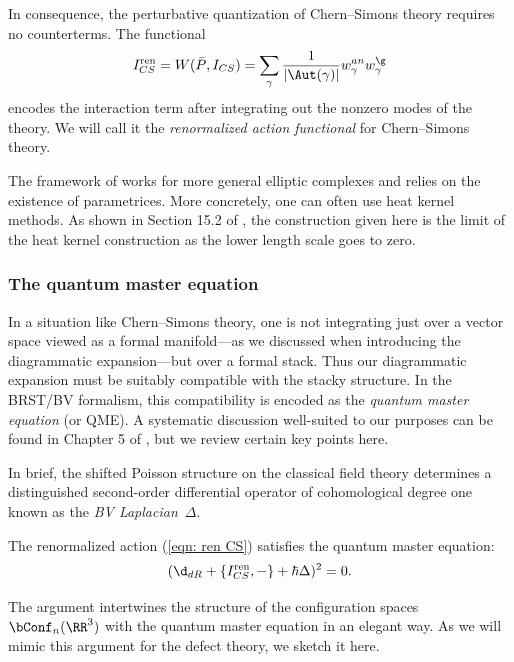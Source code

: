 \documentclass[10pt]{amsart}
\begin{document}
In consequence, the perturbative quantization of Chern--Simons theory requires no counterterms.
The functional
\begin{equation}
\label{eqn: ren CS}
I^{\rm ren}_{CS} = W(\bar{P},I_{CS}) = \sum_\gamma \frac{1}{|\Aut(\gamma)|} w_\gamma^{an} w_\gamma^\g
\end{equation}
encodes the interaction term after integrating out the nonzero modes of the theory.
We will call it the {\em renormalized action functional} for Chern--Simons theory.

\begin{rmk}
The framework of \cite{CosBook} works for more general elliptic complexes
and relies on the existence of parametrices. 
More concretely, one can often use heat kernel methods.
As shown in Section 15.2 of \cite{CosCS}, 
the construction given here is the limit of the heat kernel construction as the lower length scale goes to zero.
\end{rmk}

\subsubsection{The quantum master equation}
\label{subsec: CS QME}

In a situation like Chern--Simons theory, 
one is not integrating just over a vector space viewed as a formal manifold---as we discussed when introducing the diagrammatic expansion---but over a formal stack.
Thus our diagrammatic expansion must be suitably compatible with the stacky structure.
In the BRST/BV formalism,
this compatibility is encoded 
as the {\em quantum master equation} (or QME).
A systematic discussion well-suited to our purposes can be found in Chapter 5 of \cite{CosBook},
but we review certain key points here.

In brief, the shifted Poisson structure on the classical field theory determines a distinguished second-order differential operator of cohomological degree one known as the {\em BV Laplacian}~$\Delta$. 

\begin{thm}
The renormalized action (\ref{eqn: ren CS}) satisfies the quantum master equation:
\[
(\d_{dR} + \{I^{\rm ren}_{CS}, -\} +\hbar \Delta)^2 = 0.
\]
\end{thm}

The argument intertwines the structure of the configuration spaces $\bConf_n(\RR^3)$ with the quantum master equation in an elegant way.
As we will mimic this argument for the defect theory,
we sketch it here.
\end{document}

